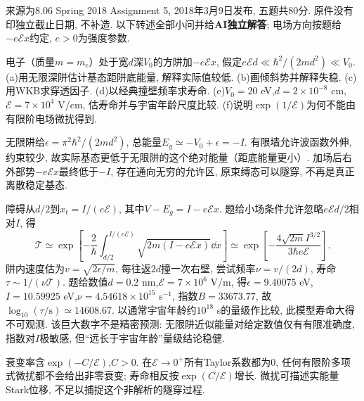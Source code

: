来源为8.06 Spring 2018 Assignment 5, 2018年3月9日发布, 五题共80分. 原件没有印独立截止日期, 不补造. 以下转述全部小问并给\textbf{AI独立解答}; 电场方向按题给$-e\mathcal E x$约定, $e>0$为强度参数.
\begin{exercise}
电子（质量$m=m_e$）处于宽$d$深$V_0$的方阱加$-e\mathcal E x$, 假定$e\mathcal E d\ll\hbar^2/(2md^2)\ll V_0$. (a)用无限深阱估计基态距阱底能量, 解释实际值较低. (b)画倾斜势并解释失稳. (c)用WKB求穿透因子. (d)以经典撞壁频率求寿命. (e)$V_0=20$ eV,$d=2\times10^{-8}$ cm,$\mathcal E=7\times10^4$ V/cm, 估寿命并与宇宙年龄尺度比较. (f)说明$\exp(1/\mathcal E)$为何不能由有限阶电场微扰得到.
\end{exercise}
\begin{solution}
无限阱给$\epsilon=\pi^2\hbar^2/(2md^2)$, 总能量$E_g\simeq-V_0+\epsilon=-I$. 有限墙允许波函数外伸, 约束较少, 故实际基态更低于无限阱的这个绝对能量（距底能量更小）. 加场后右外部势$-e\mathcal E x$最终低于$-I$, 存在通向无穷的允许区, 原束缚态可以隧穿, 不再是真正离散稳定基态.

障碍从$d/2$到$x_t=I/(e\mathcal E)$, 其中$V-E_g=I-e\mathcal E x$. 题给小场条件允许忽略$e\mathcal E d/2$相对$I$, 得
\[
\mathcal T\simeq\exp\!\left[-\frac2\hbar\int_{d/2}^{I/(e\mathcal E)}\sqrt{2m(I-e\mathcal E x)}\dd x\right]
\simeq\exp\!\left[-\frac{4\sqrt{2m}I^{3/2}}{3\hbar e\mathcal E}\right].
\]
阱内速度估为$v=\sqrt{2\epsilon/m}$, 每往返$2d$撞一次右壁, 尝试频率$\nu=v/(2d)$, 寿命$\tau\sim1/(\nu\mathcal T)$. 题给数值$d=0.2$ nm,$\mathcal E=7\times10^6$ V/m, 得$\epsilon=9.40075$ eV,$I=10.59925$ eV,$\nu=4.54618\times10^{15}$ s$^{-1}$, 指数$B=33673.77$, 故$\log_{10}(\tau/\mathrm s)\simeq14608.67$. 以通常宇宙年龄约$10^{18}$ s的量级作比较, 此模型寿命大得不可观测. 该巨大数字不是精密预测: 无限阱近似能量对给定数值仅有有限准确度, 指数对$I$极敏感, 但“远长于宇宙年龄”量级结论稳健.

衰变率含$\exp(-C/\mathcal E)$,$C>0$. 在$\mathcal E\to0^+$所有Taylor系数都为0, 任何有限阶多项式微扰都不会给出非零衰变; 寿命相反按$\exp(C/\mathcal E)$增长. 微扰可描述实能量Stark位移, 不足以捕捉这个非解析的隧穿过程.
\begin{center}\end{center}
\end{solution}
